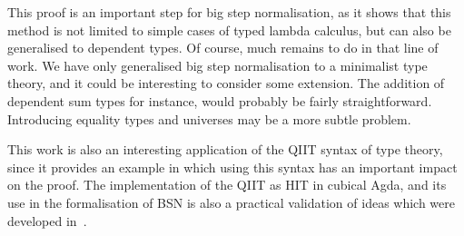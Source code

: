 \documentclass[a4paper,english]{lipics-v2019}
\begin{document}
This proof is an important step for big step normalisation, as it shows that
this method is not limited to simple cases of typed lambda calculus, but can
also be generalised to dependent types. Of course, much remains to do in that
line of work. We have only generalised big step normalisation to a minimalist
type theory, and it could be interesting to consider some extension.
The addition of dependent sum types for instance, would probably be fairly
straightforward. Introducing equality types and universes may be a more subtle
problem.

This work is also an interesting application of the QIIT syntax of type theory,
since it provides an example in which using this syntax has an important impact
on the proof. The implementation of the QIIT as HIT in cubical Agda, and its use
in the formalisation of BSN is also a practical validation of ideas which were
developed in~\cite{kaposi2016type}.


\end{document}
